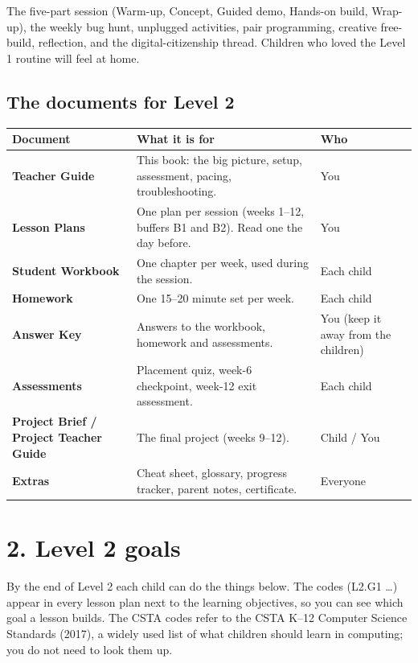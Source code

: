 \documentclass[level=2,teacher]{kidscode}
\begin{document}
\begin{tip}
The five-part session (Warm-up, Concept, Guided demo, Hands-on build, Wrap-up), the weekly
bug hunt, unplugged activities, pair programming, creative free-build, reflection, and
the digital-citizenship thread. Children who loved the Level 1 routine will feel at home.
\end{tip}

\subsection{The documents for Level 2}
\begin{tabularx}{\linewidth}{@{}>{\bfseries}p{4.2cm}X>{\raggedright\arraybackslash}p{2.6cm}@{}}
\toprule
Document & What it is for & Who \\ \midrule
Teacher Guide & This book: the big picture, setup, assessment, pacing, troubleshooting. & You \\
Lesson Plans & One plan per session (weeks 1--12, buffers B1 and B2). Read one the day before. & You \\
Student Workbook & One chapter per week, used during the session. & Each child \\
Homework & One 15--20 minute set per week. & Each child \\
Answer Key & Answers to the workbook, homework and assessments. & You (keep it away from the children) \\
Assessments & Placement quiz, week-6 checkpoint, week-12 exit assessment. & Each child \\
Project Brief / Project Teacher Guide & The final project (weeks 9--12). & Child / You \\
Extras & Cheat sheet, glossary, progress tracker, parent notes, certificate. & Everyone \\
\bottomrule
\end{tabularx}

\section{2. Level 2 goals}
By the end of Level 2 each child can do the things below. The codes (L2.G1 \ldots) appear
in every lesson plan next to the learning objectives, so you can see which goal a lesson
builds. The CSTA codes refer to the CSTA K--12 Computer Science Standards (2017), a
widely used list of what children should learn in computing; you do not need to look them up.
\end{document}
